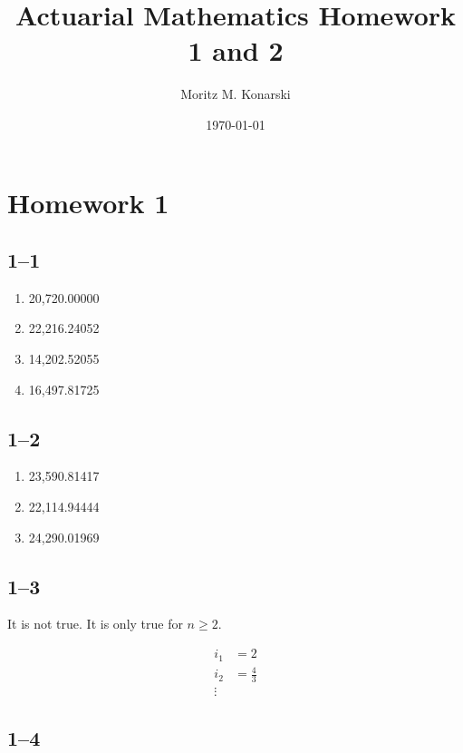 \documentclass[a4paper, 12pt, reqno]{amsart}
\title{Actuarial Mathematics Homework 1 and 2}
\author{Moritz M. Konarski}
\date{\today}
\numberwithin{equation}{section}
\begin{document}
\maketitle

\section*{Homework 1}

\subsection*{1--1}

\begin{enumerate}[label=(\alph*)]
    \item 20,720.00000
    \item 22,216.24052
    \item 14,202.52055
    \item 16,497.81725
\end{enumerate}

\subsection*{1--2}

\begin{enumerate}[label=(\alph*)]
    \item 23,590.81417
    \item 22,114.94444
    \item 24,290.01969
\end{enumerate}

\subsection*{1--3}

It is not true. It is only true for $n \ge 2$.

\begin{equation}\nonumber
    \begin{aligned}
        i_1 &= 2 \\
        i_2 &= \frac{4}{3}  \\
        \vdots
    \end{aligned}
\end{equation}

\subsection*{1--4}
\end{document}
